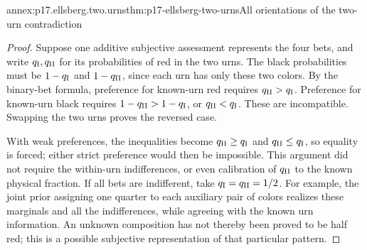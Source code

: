 \begin{annexitem}{annex:p17.ellsberg.two.urns}{thm:p17-ellsberg-two-urns}{All orientations of the two-urn contradiction}
\begin{proof}
Suppose one additive subjective assessment represents
the four bets, and write \(q_{\rm I},q_{\rm II}\)
for its probabilities of red in the two urns.
The black probabilities must be \(1-q_{\rm I}\)
and \(1-q_{\rm II}\), since each urn has only
these two colors.
By the binary-bet formula, preference for known-urn
red requires \(q_{\rm II}>q_{\rm I}\).
Preference for known-urn black requires
\(1-q_{\rm II}>1-q_{\rm I}\), or
\(q_{\rm II}<q_{\rm I}\). These are incompatible.
Swapping the two urns proves the reversed case.

With weak preferences, the inequalities become
\(q_{\rm II}\geq q_{\rm I}\) and
\(q_{\rm II}\leq q_{\rm I}\), so equality is forced;
either strict preference would then be impossible.
This argument did not require the within-urn
indifferences, or even calibration of \(q_{\rm II}\)
to the known physical fraction. If all bets are
indifferent, take \(q_{\rm I}=q_{\rm II}=1/2\).
For example, the joint prior assigning one quarter
to each auxiliary pair of colors realizes these
marginals and all the indifferences, while agreeing
with the known urn information.
An unknown composition has not thereby been proved
to be half red; this is a possible subjective
representation of that particular pattern.
\end{proof}
\end{annexitem}

